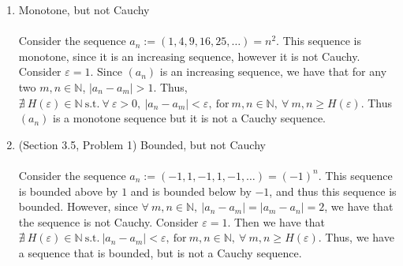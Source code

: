 \documentclass[12pt,letterpaper]{article}
\newcommand{\st}{\ \text{s.t.}\ }
\newcommand{\N}{\mathbb{N}}
\theoremstyle{case}
\theoremstyle{definition}
\begin{document}
\begin{enumerate}
\begin{enumerate}
			\item Monotone, but not Cauchy
			\\\\Consider the sequence $a_n:=(1,4,9,16,25,\dots)=n^2$. This sequence is monotone, since it is an increasing sequence, however it is not Cauchy. Consider $\varepsilon=1$. Since $(a_n)$ is an increasing sequence, we have that for any two $m,n \in \N$, $|a_n-a_m| > 1$. Thus, $\nexists\ H(\varepsilon) \in \N \st \forall\ \varepsilon > 0,\ |a_n-a_m|<\varepsilon,\ \text{for}\ m,n\in \N,\ \forall\ m,n \geq H(\varepsilon)$. Thus $(a_n)$ is a monotone sequence but it is not a Cauchy sequence.\\
			
			\item (Section 3.5, Problem 1) Bounded, but not Cauchy
			\\\\Consider the sequence $a_n:=(-1,1,-1,1,-1, \dots)=(-1)^n$. This sequence is bounded above by $1$ and is bounded below by $-1$, and thus this sequence is bounded. However, since $\forall\ m,n \in \N,\ |a_n-a_m|=|a_m-a_n|=2$, we have that the sequence is not Cauchy. Consider $\varepsilon = 1$. Then we have that $\nexists\ H(\varepsilon) \in \N \st |a_n-a_m|<\varepsilon,\ \text{for}\ m,n \in \N,\ \forall\ m,n\geq H(\varepsilon)$. Thus, we have a sequence that is bounded, but is not a Cauchy sequence.\\
		\end{enumerate}
		

\end{enumerate}
\end{document}
